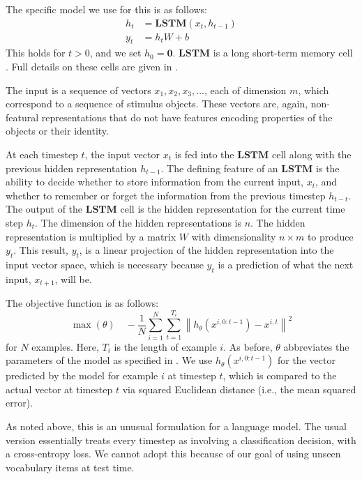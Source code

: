 \documentclass[9pt,twocolumn,twoside,lineno]{pnas-new}
\newcommand{\update}[1]{{\color{darkblue}#1}}
\newcommand{\LSTM}{\textbf{LSTM}}
\begin{document}
The specific model we use for this is as follows:
%
\begin{align}
  h_{t} &= \LSTM(x_{t}, h_{t-1}) \label{eq:lstm-recur}\\
  y_{t} &= h_{t}W + b\label{eq:lstm-predict}
\end{align}
%
This holds for $t > 0$, and we set $h_{0} = \mathbf{0}$. $\LSTM$ is a long short-term memory cell \citep{hochreiter:1997}. Full details on these cells are given in .

The input is a sequence of vectors $x_1, x_2, x_3, \dots$, each of dimension $m$, which correspond to a sequence of stimulus objects.  These vectors are, again, non-featural representations that do not have features encoding properties of the objects or their identity.


At each timestep $t$, the input vector $x_t$ is fed into the $\LSTM$ cell along with the previous hidden representation $h_{t-1}$. The defining feature of an $\LSTM$ is the ability to decide whether to store information from the current input, $x_t$, and whether to remember or forget the information from the previous timestep $h_{t-t}$. The output of the $\LSTM$ cell is the hidden representation for the current time step $h_t$. The dimension of the hidden representations is $n$. The hidden representation is multiplied by a matrix $W$ with dimensionality $n \times m$ to produce $y_t$. This result, $y_t$, is a linear projection of the hidden representation into the input vector space, which is necessary because $y_t$ is a prediction of what the next input, $x_{t+1}$, will be.

\update{
  The objective function is as follows:
%
\begin{equation}
  \max(\theta)
  \quad
  -\frac{1}{N}
  \sum_{i=1}^{N}
  \sum_{t=1}^{T_{i}}
  \left\| h_{\theta}\left(x^{i, 0:{t-1}}\right) - x^{i,t} \right\|^{2}
\end{equation}
%
for $N$ examples. Here, $T_{i}$ is the length of example $i$. As before, $\theta$ abbreviates the parameters of the model as specified in \dasheg{eq:lstm-recur}{eq:lstm-predict}. We use $h_{\theta}(x^{i, 0:{t-1}})$ for the vector predicted by the model for example $i$ at timestep $t$, which is compared to the actual vector at timestep $t$ via squared Euclidean distance (i.e., the mean squared error).

As noted above, this is an unusual formulation for a language model. The usual version essentially treats every timestep as involving a classification decision, with a cross-entropy loss. We cannot adopt this because of our goal of using unseen vocabulary items at test time.}
\end{document}
